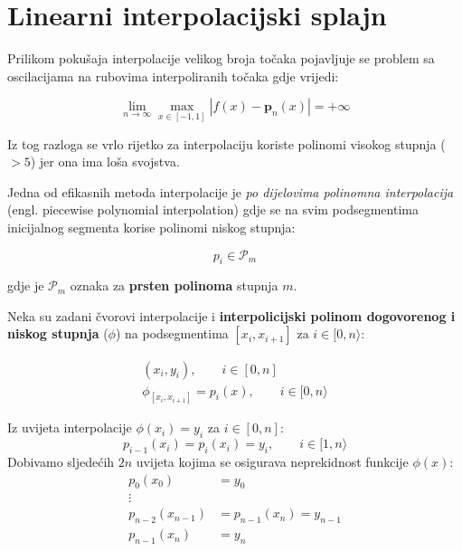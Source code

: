 \section{Linearni interpolacijski splajn}

Prilikom pokušaja interpolacije velikog broja točaka pojavljuje se problem sa oscilacijama na rubovima interpoliranih točaka gdje vrijedi:

$$
\lim_{n\to \infty}\max_{x\in[-1,1]}\left|f(x)-{\mathbf p}_n(x)\right| = +\infty
$$

Iz tog razloga se vrlo rijetko za interpolaciju koriste polinomi visokog stupnja ($>5$) jer ona ima loša svojstva.

Jedna od efikasnih metoda interpolacije je \textit{po dijelovima polinomna interpolacija} (engl. piecewise polynomial interpolation) gdje se na svim podsegmentima inicijalnog segmenta korise polinomi niskog stupnja:

$$
p_i \in \mathcal{P}_m
$$

gdje je $\mathcal{P}_m$ oznaka za \textbf{prsten polinoma} stupnja $m$.

Neka su zadani čvorovi interpolacije i \textbf{interpolicijski polinom dogovorenog i niskog stupnja} ($\phi$) na podsegmentima $[x_i,x_{i+1}]$ za $i\in[0,n\rangle$:

\begin{gather}
(x_i,y_i),\qquad i\in[0,n]\nonumber\\
\phi_{[x_i,x_{i+1}]} = p_i(x),\qquad i\in[0,n\rangle
\end{gather}

\begin{conditionbox}
    Iz uvijeta interpolacije $\phi(x_i) = y_i$ za $i\in[0,n]$:
    \begin{equation}
        \label{ls_continuation}
        p_{i-1}(x_i) = p_i(x_i)=y_i,\qquad i\in[1,n\rangle
    \end{equation}
    Dobivamo sljedećih $2n$ uvijeta kojima se osigurava neprekidnost funkcije $\phi(x)$:
    \begin{align}
        \label{ls_match_first}
        p_0(x_0) &= y_0\\
        \vdots\quad&\nonumber\\
        \label{ls_match_transition}
        p_{n-2}(x_{n-1}) &= p_{n-1}(x_n) = y_{n-1}\\
        \label{ls_match_last}
        p_{n-1}(x_n) &= y_n
    \end{align}
\end{conditionbox}

